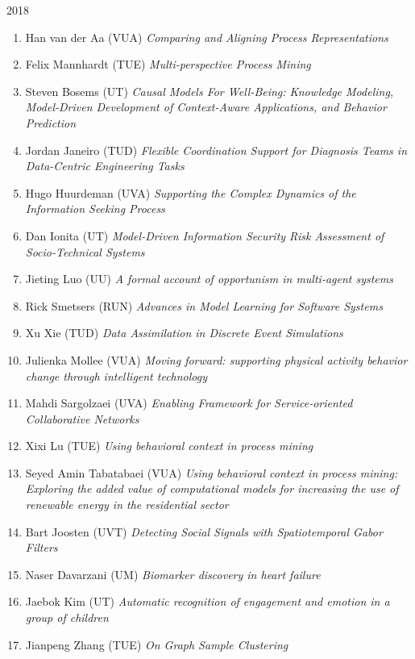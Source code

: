 \begin{multicols}{2}
\begin{scriptsize}
\vspace{0.2cm}
2018
\vspace{0.2cm}
\begin{enumerate}[leftmargin=*,noitemsep,topsep=0pt,parsep=1pt,partopsep=0pt]
\renewcommand{\labelenumi}{2018-\arabic{enumi}}
\item Han van der Aa (VUA) \textit{Comparing and Aligning Process Representations}
\item Felix Mannhardt (TUE) \textit{Multi-perspective Process Mining
}\item Steven Bosems (UT) \textit{Causal Models For Well-Being: Knowledge Modeling, Model-Driven Development of Context-Aware Applications, and Behavior Prediction
}\item Jordan Janeiro (TUD) \textit{Flexible Coordination Support for Diagnosis Teams in Data-Centric Engineering Tasks
}\item Hugo Huurdeman (UVA) \textit{Supporting the Complex Dynamics of the Information Seeking Process
}\item Dan Ionita (UT) \textit{Model-Driven Information Security Risk Assessment of Socio-Technical Systems
}\item Jieting Luo (UU) \textit{A formal account of opportunism in multi-agent systems
}\item Rick Smetsers (RUN) \textit{Advances in Model Learning for Software Systems
}\item Xu Xie (TUD) \textit{Data Assimilation in Discrete Event Simulations	
}\item Julienka Mollee (VUA) \textit{Moving forward: supporting physical activity behavior change through intelligent technology
}\item Mahdi Sargolzaei (UVA) \textit{Enabling Framework for Service-oriented Collaborative Networks
}\item Xixi Lu (TUE) \textit{Using behavioral context in process mining
}\item Seyed Amin Tabatabaei (VUA) \textit{Using behavioral context in process mining: Exploring the added value of computational models for increasing the use of renewable energy in the residential sector
}\item Bart Joosten (UVT) \textit{Detecting Social Signals with Spatiotemporal Gabor Filters}
\item Naser Davarzani (UM) \textit{Biomarker discovery in heart failure}
\item Jaebok Kim (UT) \textit{Automatic recognition of engagement and emotion in a group of children 
}\item Jianpeng Zhang (TUE) \textit{On Graph Sample Clustering 	
}
\end{enumerate}
\end{scriptsize}
\end{multicols}
